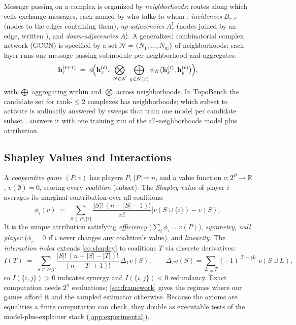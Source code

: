 Message passing on a complex is organized by \emph{neighborhoods}:
routes along which cells exchange messages, each named by who talks to
whom \citep{papillon2025topotune}: \emph{incidences} $B_{r,r'}$
(\eg nodes to the edges containing them), \emph{up-adjacencies}
$A^{\uparrow}_{r}$ (\eg nodes joined by an edge, written
), and \emph{down-adjacencies}
$A^{\downarrow}_{r}$. A generalized combinatorial complex network
(GCCN) is specified by a set $\mathcal{N} = \{N_1, \dots, N_m\}$ of
neighborhoods; each layer runs one message-passing submodule per
neighborhood and aggregates:
\begin{equation}
\label{eq:gccn-layer}
\mathbf{h}^{(\ell+1)}_x
  \;=\;
  \phi\!\Bigl(\mathbf{h}^{(\ell)}_x,\;
  \bigotimes_{N \in \mathcal{N}}\;
  \bigoplus_{y \in N(x)}
  \psi_{N}\bigl(\mathbf{h}^{(\ell)}_x, \mathbf{h}^{(\ell)}_y\bigr)\Bigr),
\end{equation}
with $\bigoplus$ aggregating within and $\bigotimes$ across
neighborhoods. In TopoBench the candidate set for rank-$\le 2$
complexes has \unfrozen{\ResNumNeighborhoods} neighborhoods; which
subset to activate is ordinarily answered by sweeps that train one
model per candidate subset \citep{papillon2025topotune}.
 answers it with one training run of the
all-neighborhoods model plus attribution.

\subsection{Shapley Values and Interactions}
\label{sec:prelim-shapley}

A \emph{cooperative game} $(P, v)$ has players $P$, $|P| = n$, and a
value function $v : 2^{P} \to \mathbb{R}$, $v(\emptyset) = 0$, scoring
every \emph{coalition} (subset). The \emph{Shapley value}
\citep{shapley1953value} of player $i$ averages its marginal
contribution over all coalitions:
\begin{equation}
\label{eq:shapley}
\phi_i(v) \;=\; \sum_{S \subseteq P \setminus \{i\}}
  \frac{|S|!\,(n - |S| - 1)!}{n!}
  \bigl[v(S \cup \{i\}) - v(S)\bigr].
\end{equation}
It is the unique attribution satisfying \emph{efficiency}
($\sum_i \phi_i = v(P)$), \emph{symmetry}, \emph{null player}
($\phi_i = 0$ if $i$ never changes any coalition's value), and
\emph{linearity}. The \emph{interaction index}
\citep{grabisch1999axiomatic} extends \cref{eq:shapley} to coalitions
$T$ via discrete derivatives:
\begin{equation}
\label{eq:interaction}
I(T) \;=\; \sum_{S \subseteq P \setminus T}
  \frac{|S|!\,(n - |S| - |T|)!}{(n - |T| + 1)!}\,
  \Delta_{T} v(S),
\qquad
\Delta_{T} v(S) = \sum_{L \subseteq T} (-1)^{|T| - |L|}\, v(S \cup L),
\end{equation}
so $I(\{i,j\}) > 0$ indicates synergy and $I(\{i,j\}) < 0$ redundancy.
Exact computation needs $2^{n}$ evaluations; \cref{sec:framework}
gives the regimes where our games afford it and the sampled estimator
otherwise. Because the axioms are equalities a finite computation can
check, they double as executable tests of the model-plus-explainer
stack (\cref{app:experimental}).
